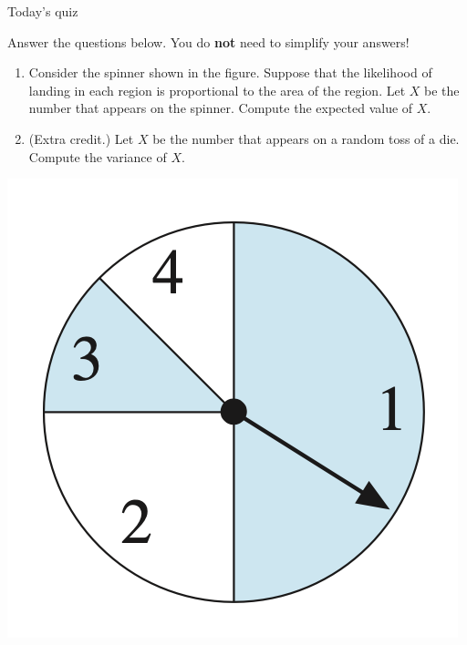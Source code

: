 \documentclass[10pt]{beamer}
\begin{document}
\begin{frame}[standout]
Today's quiz
\end{frame}

\begin{frame}
\small 

\begin{myredbox}[title=\text{Reading Quiz (Expectation)}]

Answer the questions below.  You do \textbf{not} need to simplify your answers! \\

\begin{minipage}{.7\textwidth}
\begin{enumerate}
	\item Consider the spinner shown in the figure. Suppose that the likelihood of landing in each region is proportional to the area of the region.  Let $X$ be the number that appears on the spinner. Compute the expected value of $X$.
	\item (Extra credit.) Let $X$ be the number that appears on a random toss of a die.  Compute the variance of $X$.
\end{enumerate}
\end{minipage} %
\hfill 
\begin{minipage}{.28\textwidth}
\includegraphics[width=\textwidth]{images/spinner.png}
\end{minipage}

\end{myredbox}
	
\end{frame}
\end{document}
